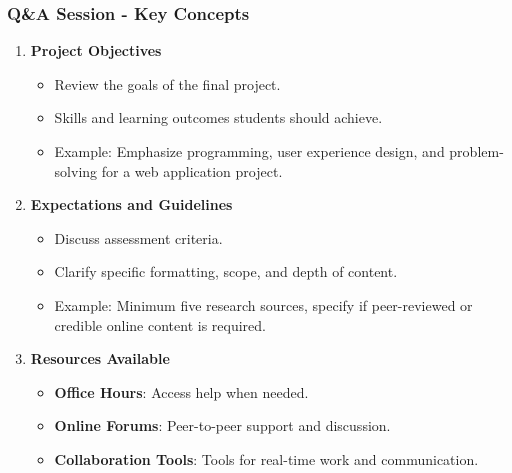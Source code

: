 \documentclass[aspectratio=169]{beamer}
\begin{document}
\begin{frame}[fragile]
    \frametitle{Q\&A Session - Key Concepts}
    \begin{enumerate}
        \item \textbf{Project Objectives}
        \begin{itemize}
            \item Review the goals of the final project.
            \item Skills and learning outcomes students should achieve.
            \item Example: Emphasize programming, user experience design, and problem-solving for a web application project.
        \end{itemize}
        
        \item \textbf{Expectations and Guidelines}
        \begin{itemize}
            \item Discuss assessment criteria.
            \item Clarify specific formatting, scope, and depth of content.
            \item Example: Minimum five research sources, specify if peer-reviewed or credible online content is required.
        \end{itemize}

        \item \textbf{Resources Available}
        \begin{itemize}
            \item \textbf{Office Hours}: Access help when needed.
            \item \textbf{Online Forums}: Peer-to-peer support and discussion.
            \item \textbf{Collaboration Tools}: Tools for real-time work and communication.
        \end{itemize}
    \end{enumerate}
\end{frame}
\end{document}
